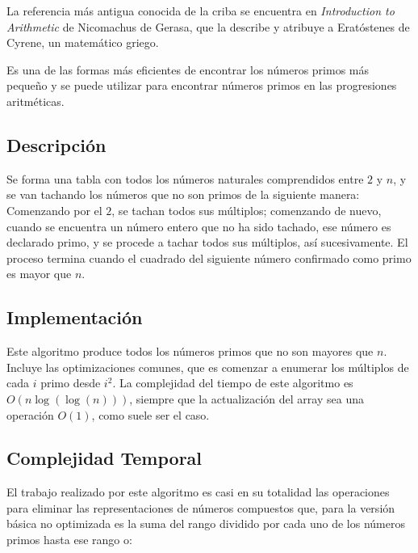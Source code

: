 \documentclass[12pt]{article}
\newcommand{\nl}{\vspace{0.3cm}}
\begin{document}
\nl

La referencia más antigua conocida de la criba se encuentra en \textit{Introduction to Arithmetic}\cite{ngpia} de Nicomachus de Gerasa, que la describe y atribuye a Eratóstenes de Cyrene, un matemático griego.

\nl

Es una de las formas más eficientes de encontrar los números primos más pequeño y se puede utilizar para encontrar números primos en las progresiones aritméticas.\cite{eseapa}

\subsection{Descripción}

\nl

Se forma una tabla con todos los números naturales comprendidos entre $2$ y $n$, y se van tachando los números que no son primos de la siguiente manera: Comenzando por el $2$, se tachan todos sus múltiplos; comenzando de nuevo, cuando se encuentra un número entero que no ha sido tachado, ese número es declarado primo, y se procede a tachar todos sus múltiplos, así sucesivamente. El proceso termina cuando el cuadrado del siguiente número confirmado como primo es mayor que $n$.

\subsection{Implementación}



\newpage

Este algoritmo produce todos los números primos que no son mayores que $n$. Incluye las optimizaciones comunes, que es comenzar a enumerar los múltiplos de cada $i$ primo desde $i^2$. La complejidad del tiempo de este algoritmo es $O(n \log(\log(n)))$\cite{aipns}, siempre que la actualización del array sea una operación $O(1)$, como suele ser el caso.

\nl

\subsection{Complejidad Temporal}

\nl

El trabajo realizado por este algoritmo es casi en su totalidad las operaciones para eliminar las representaciones de números compuestos que, para la versión básica no optimizada es la suma del rango dividido por cada uno de los números primos hasta ese rango o:
\end{document}
